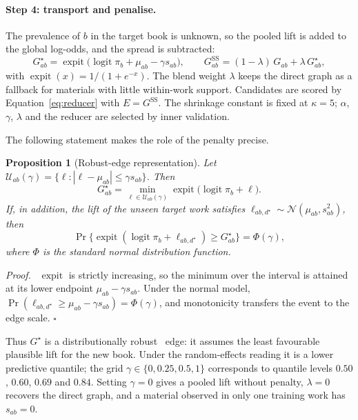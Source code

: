 \documentclass[10pt,a4paper]{article}
\newcommand{\logit}{\operatorname{logit}}
\newcommand{\expit}{\operatorname{expit}}
\newtheorem{xprop}{Proposition}
\newenvironment{xproof}{\par\noindent\textit{Proof.}\ }{\hfill$\square$\par\medskip}
\begin{document}
\paragraph{Step 4: transport and penalise.} The prevalence of $b$ in the target book is unknown, so the pooled lift is added to the global log-odds, and the spread is subtracted:
\begin{equation}
G^{\star}_{ab}=\expit\bigl(\logit\pi_b+\mu_{ab}-\gamma s_{ab}\bigr),\qquad
G^{\mathrm{SS}}_{ab}=(1-\lambda)\,G_{ab}+\lambda\,G^{\star}_{ab},
\label{eq:sscl}
\end{equation}
with $\expit(x)=1/(1+e^{-x})$. The blend weight $\lambda$ keeps the direct graph as a fallback for materials with little within-work support. Candidates are scored by Equation~\eqref{eq:reducer} with $E=G^{\mathrm{SS}}$. The shrinkage constant is fixed at $\kappa=5$; $\alpha$, $\gamma$, $\lambda$ and the reducer are selected by inner validation.

The following statement makes the role of the penalty precise.

\begin{xprop}[Robust-edge representation]
\label{prop:robust}
Let $\mathcal U_{ab}(\gamma)=\{\ell:|\ell-\mu_{ab}|\le\gamma s_{ab}\}$. Then
\begin{equation}
G^{\star}_{ab}=\min_{\ell\in\mathcal U_{ab}(\gamma)}\expit\bigl(\logit\pi_b+\ell\bigr).
\label{eq:robust}
\end{equation}
If, in addition, the lift of the unseen target work satisfies $\ell_{ab,d^\star}\sim\mathcal N(\mu_{ab},s_{ab}^2)$, then
\begin{equation*}
\Pr\bigl\{\expit(\logit\pi_b+\ell_{ab,d^\star})\ge G^\star_{ab}\bigr\}=\Phi(\gamma),
\end{equation*}
where $\Phi$ is the standard normal distribution function.
\end{xprop}
\begin{xproof}
$\expit$ is strictly increasing, so the minimum over the interval is attained at its lower endpoint $\mu_{ab}-\gamma s_{ab}$. Under the normal model, $\Pr(\ell_{ab,d^\star}\ge\mu_{ab}-\gamma s_{ab})=\Phi(\gamma)$, and monotonicity transfers the event to the edge scale.
\end{xproof}

Thus $G^\star$ is a distributionally robust~\cite{bental2009} edge: it assumes the least favourable plausible lift for the new book. Under the random-effects reading it is a lower predictive quantile; the grid $\gamma\in\{0,0.25,0.5,1\}$ corresponds to quantile levels $0.50$, $0.60$, $0.69$ and $0.84$. Setting $\gamma=0$ gives a pooled lift without penalty, $\lambda=0$ recovers the direct graph, and a material observed in only one training work has $s_{ab}=0$.
\end{document}
